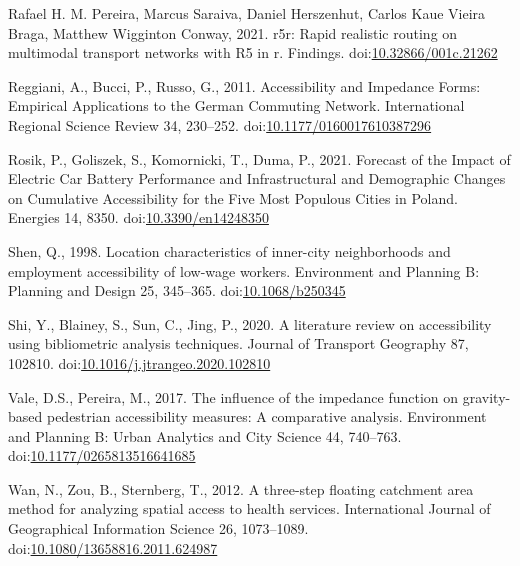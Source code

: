 \documentclass[]{elsarticle} %
\newlength{\cslhangindent}
\newlength{\cslentryspacingunit} %
\newenvironment{CSLReferences}[2] %
 {%
  \setlength{\parindent}{0pt}
  \ifodd #1
  \let\oldpar\par
  \def\par{\hangindent=\cslhangindent\oldpar}
  \fi
  \setlength{\parskip}{#2\cslentryspacingunit}
 }%
 {}
\begin{document}
\begin{CSLReferences}{1}{0}
\leavevmode{}%
Rafael H. M. Pereira, Marcus Saraiva, Daniel Herszenhut, Carlos Kaue
Vieira Braga, Matthew Wigginton Conway, 2021. r5r: Rapid realistic
routing on multimodal transport networks with R5 in r. Findings.
doi:\href{https://doi.org/10.32866/001c.21262}{10.32866/001c.21262}

\leavevmode{}%
Reggiani, A., Bucci, P., Russo, G., 2011. Accessibility and {Impedance}
{Forms}: {Empirical} {Applications} to the {German} {Commuting}
{Network}. International Regional Science Review 34, 230--252.
doi:\href{https://doi.org/10.1177/0160017610387296}{10.1177/0160017610387296}

\leavevmode{}%
Rosik, P., Goliszek, S., Komornicki, T., Duma, P., 2021. Forecast of the
{Impact} of {Electric} {Car} {Battery} {Performance} and
{Infrastructural} and {Demographic} {Changes} on {Cumulative}
{Accessibility} for the {Five} {Most} {Populous} {Cities} in {Poland}.
Energies 14, 8350.
doi:\href{https://doi.org/10.3390/en14248350}{10.3390/en14248350}

\leavevmode{}%
Shen, Q., 1998. Location characteristics of inner-city neighborhoods and
employment accessibility of low-wage workers. Environment and Planning
B: Planning and Design 25, 345--365.
doi:\href{https://doi.org/10.1068/b250345}{10.1068/b250345}

\leavevmode{}%
Shi, Y., Blainey, S., Sun, C., Jing, P., 2020. A literature review on
accessibility using bibliometric analysis techniques. Journal of
Transport Geography 87, 102810.
doi:\href{https://doi.org/10.1016/j.jtrangeo.2020.102810}{10.1016/j.jtrangeo.2020.102810}

\leavevmode{}%
Vale, D.S., Pereira, M., 2017. The influence of the impedance function
on gravity-based pedestrian accessibility measures: {A} comparative
analysis. Environment and Planning B: Urban Analytics and City Science
44, 740--763.
doi:\href{https://doi.org/10.1177/0265813516641685}{10.1177/0265813516641685}

\leavevmode{}%
Wan, N., Zou, B., Sternberg, T., 2012. A three-step floating catchment
area method for analyzing spatial access to health services.
International Journal of Geographical Information Science 26,
1073--1089.
doi:\href{https://doi.org/10.1080/13658816.2011.624987}{10.1080/13658816.2011.624987}


\end{CSLReferences}
\end{document}
